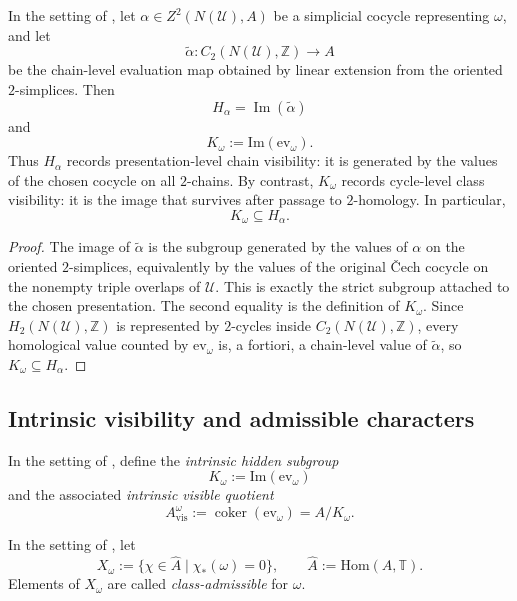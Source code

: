 \begin{proposition}\label{prop:strict-vs-intrinsic-hidden-subgroups}
In the setting of , let $\alpha\in Z^2(N(\mathcal U),A)$ be a simplicial cocycle representing $\omega$, and let
\[
\widetilde\alpha:C_2(N(\mathcal U),\mathbb Z)\to A
\]
be the chain-level evaluation map obtained by linear extension from the oriented $2$-simplices. Then
\[
H_\alpha=\operatorname{Im}(\widetilde\alpha)
\]
and
\[
K_{\omega}:=\mathrm{Im}(\mathrm{ev}_{\omega}).
\]
Thus $H_\alpha$ records presentation-level chain visibility: it is generated by the values of the chosen cocycle on all $2$-chains. By contrast, $K_{\omega}$ records cycle-level class visibility: it is the image that survives after passage to $2$-homology. In particular,
\[
K_{\omega}\subseteq H_\alpha.
\]
\end{proposition}
\begin{proof}
The image of $\widetilde\alpha$ is the subgroup generated by the values of $\alpha$ on the oriented $2$-simplices, equivalently by the values of the original \v{C}ech cocycle on the nonempty triple overlaps of $\mathcal U$. This is exactly the strict subgroup attached to the chosen presentation. The second equality is the definition of $K_\omega$. Since $H_2(N(\mathcal U),\mathbb Z)$ is represented by $2$-cycles inside $C_2(N(\mathcal U),\mathbb Z)$, every homological value counted by $\mathrm{ev}_\omega$ is, a fortiori, a chain-level value of $\widetilde\alpha$, so $K_\omega\subseteq H_\alpha$.
\end{proof}

\subsection{Intrinsic visibility and admissible characters}

\begin{definition}\label{def:intrinsic-visible-quotient}
In the setting of , define the \emph{intrinsic hidden subgroup}
\[
K_{\omega}:=\mathrm{Im}(\mathrm{ev}_{\omega})
\]
and the associated \emph{intrinsic visible quotient}
\[
A_{\mathrm{vis}}^{\omega}:=\operatorname{coker}(\mathrm{ev}_{\omega})=A/K_{\omega}.
\]
\end{definition}

\begin{definition}\label{def:class-admissible-character}
In the setting of , let
\[
X_{\omega}:=\{\chi\in\widehat A\mid \chi_*(\omega)=0\},
\qquad
\widehat A:=\mathrm{Hom}(A,\mathbb T).
\]
Elements of $X_{\omega}$ are called \emph{class-admissible} for $\omega$.
\end{definition}

